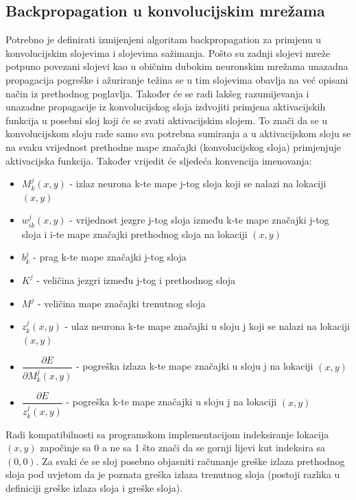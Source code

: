 \documentclass[times, utf8, zavrsni, numeric]{fer}
\begin{document}
\subsection{Backpropagation u konvolucijskim mrežama}
Potrebno je definirati izmijenjeni algoritam backpropagation za primjenu u konvolucijskim slojevima i slojevima sažimanja. Pošto su zadnji slojevi mreže potpuno povezani slojevi kao u običnim dubokim neuronskim mrežama unazadna propagacija pogreške i ažuriranje težina se u tim slojevima obavlja na već opisani način iz prethodnog poglavlja. Također će se radi lakšeg razumijevanja i unazadne propagacije iz konvolucijskog sloja izdvojiti primjena aktivacijskih funkcija u posebni sloj koji će se zvati aktivacijskim slojem. To znači da se u konvolucijskom sloju rade samo sva potrebna sumiranja a u aktivacijskom sloju se na svaku vrijednost prethodne mape značajki (konvolucijskog sloja) primjenjuje aktivacijska funkcija. Također vrijedit će sljedeća konvencija imenovanja:
\begin{itemize}
  \item $M_k^j (x, y)$ - izlaz neurona k-te mape j-tog sloja koji se nalazi na lokaciji $(x, y)$
  \item $w^j_{ik} (x, y)$ - vrijednost jezgre j-tog sloja između k-te mape značajki j-tog sloja i i-te mape značajki prethodnog sloja na lokaciji $(x, y)$
  \item $b^j_k$ - prag k-te mape značajki j-tog sloja
  \item $K^j$ - veličina jezgri između j-tog i prethodnog sloja
  \item $M^j$ - veličina mape značajki trenutnog sloja
  \item $z^j_k (x, y)$ - ulaz neurona k-te mape značajki u sloju j koji se nalazi na lokaciji $(x, y)$
  \item $\dfrac{\partial E}{\partial M^j_k (x, y)}$ - pogreška izlaza k-te mape značajki u sloju j na lokaciji $(x, y)$
  \item $\dfrac{\partial E}{z^j_k (x, y)}$ - pogreška k-te mape značajki u sloju j na lokaciji $(x, y)$
\end{itemize}

Radi kompatibilnosti sa programskom implementacijom indeksiranje lokacija $(x, y)$ započinje sa 0 a ne sa 1 što znači da se gornji lijevi kut indeksira sa $(0, 0)$.
Za svaki će se sloj posebno objasniti računanje greške izlaza prethodnog sloja pod uvjetom da je poznata greška izlaza trenutnog sloja (postoji razlika u definiciji greške izlaza sloja i greške sloja).
\end{document}
